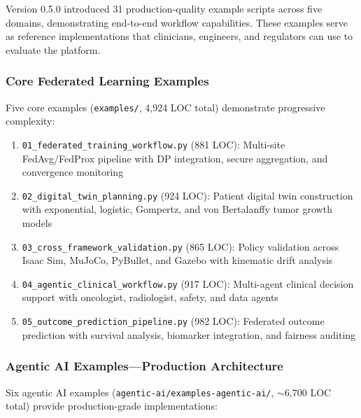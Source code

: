 \documentclass[10pt]{article}
\begin{document}
Version 0.5.0 introduced 31 production-quality example scripts across five domains, demonstrating end-to-end workflow capabilities. These examples serve as reference implementations that clinicians, engineers, and regulators can use to evaluate the platform.

\subsubsection{Core Federated Learning Examples}

Five core examples (\texttt{examples/}, 4,924 LOC total) demonstrate progressive complexity:
\begin{enumerate}
  \item \texttt{01\_federated\_training\_workflow.py} (881 LOC): Multi-site FedAvg/FedProx pipeline with DP integration, secure aggregation, and convergence monitoring
  \item \texttt{02\_digital\_twin\_planning.py} (924 LOC): Patient digital twin construction with exponential, logistic, Gompertz, and von Bertalanffy tumor growth models
  \item \texttt{03\_cross\_framework\_validation.py} (865 LOC): Policy validation across Isaac Sim, MuJoCo, PyBullet, and Gazebo with kinematic drift analysis
  \item \texttt{04\_agentic\_clinical\_workflow.py} (917 LOC): Multi-agent clinical decision support with oncologist, radiologist, safety, and data agents
  \item \texttt{05\_outcome\_prediction\_pipeline.py} (982 LOC): Federated outcome prediction with survival analysis, biomarker integration, and fairness auditing
\end{enumerate}

\subsubsection{Agentic AI Examples---Production Architecture}

Six agentic AI examples (\texttt{agentic-ai/examples-agentic-ai/}, $\sim$6,700 LOC total) provide production-grade implementations:
\end{document}

